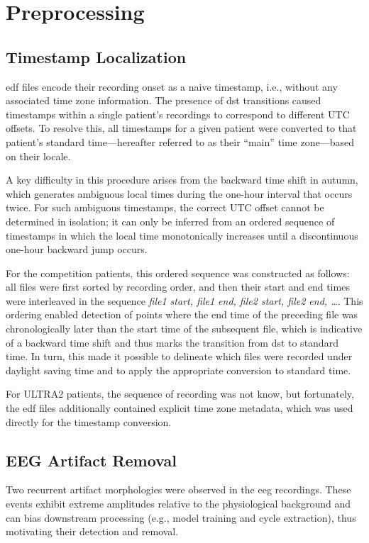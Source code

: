 \section{Preprocessing} \label{sec:preprocessing}

\subsection{Timestamp Localization} \label{subsec:timestamp-localization}
\Gls{edf} files encode their recording onset as a naive timestamp, i.e., without any associated time zone information. The presence of \gls{dst} transitions caused timestamps within a single patient’s recordings to correspond to different UTC offsets.
To resolve this, all timestamps for a given patient were converted to that patient’s standard time—hereafter referred to as their “main” time zone—based on their locale.

A key difficulty in this procedure arises from the backward time shift in autumn, which generates ambiguous local times during the one-hour interval that occurs twice.
For such ambiguous timestamps, the correct UTC offset cannot be determined in isolation; it can only be inferred from an ordered sequence of timestamps in which the local time monotonically increases until a discontinuous one-hour backward jump occurs.

For the competition patients, this ordered sequence was constructed as follows: all files were first sorted by recording order, and then their start and end times were interleaved in the sequence \textit{file1 start, file1 end, file2 start, file2 end, …}.
This ordering enabled detection of points where the end time of the preceding file was chronologically later than the start time of the subsequent file, which is indicative of a backward time shift and thus marks the transition from \gls{dst} to standard time.
In turn, this made it possible to delineate which files were recorded under daylight saving time and to apply the appropriate conversion to standard time.

For ULTRA2 patients, the sequence of recording was not know, but fortunately, the \gls{edf} files additionally contained explicit time zone metadata, which was used directly for the timestamp conversion.

\subsection{EEG Artifact Removal} \label{subsec:eeg-artifact-removal}
Two recurrent artifact morphologies were observed in the \gls{eeg} recordings.
These events exhibit extreme amplitudes relative to the physiological background and can bias downstream processing (e.g., model training and cycle extraction), thus motivating their detection and removal.

